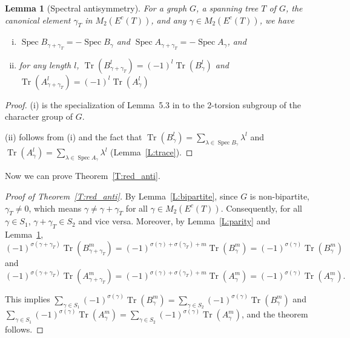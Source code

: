 \documentclass[11pt]{amsart}
\theoremstyle{plain}
\newtheorem{lemma}[theorem]{Lemma}
\theoremstyle{definition}
\DeclareMathOperator{\spec}{\operatorname{Spec}}
\DeclareMathOperator{\trace}{\operatorname{Tr}}
\numberwithin{equation}{section}
\begin{document}
\begin{lemma}[Spectral antisymmetry] \label{L:antisymmetry}
For a graph $G$, a spanning tree $T$ of $G$, the canonical element $\gamma_T$ in $M_2(E^c(T) )$, and any $\gamma\in M_2(E^c(T))$, we have 
\begin{enumerate}[(i)]
\item $\spec B_{\gamma+\gamma_T}=-\spec B_\gamma$ and $\spec A_{\gamma+\gamma_T} = -\spec A_\gamma$, and
\item for any length $l$, $\trace\left(B_{\gamma+\gamma_T}^l\right) = (-1)^l \trace\left(B_\gamma^l\right)$ and $\trace\left(A_{\gamma+\gamma_T}^l\right) = (-1)^l \trace\left(A_\gamma^l\right)$
\end{enumerate}
\end{lemma}


\begin{proof}
(i) is the specialization of Lemma~5.3 in \cite{LR2024spectral} to the 2-torsion subgroup of the character group of $G$.

(ii) follows from (i) and the fact that $\trace\left(B_\gamma^l\right)=\sum_{\lambda\in \spec B_\gamma}\lambda^l$ and $\trace\left(A_\gamma^l\right)=\sum_{\lambda\in \spec A_\gamma}\lambda^l$ (Lemma~\ref{L:trace}). 
\end{proof}

Now we can prove Theorem~\ref{T:red_anti}. 
\begin{proof}[Proof of Theorem~\ref{T:red_anti}]
By Lemma~\ref{L:bipartite}, since $G$ is non-bipartite, $\gamma_T\neq 0$, which means  $\gamma\neq \gamma+\gamma_T$ for all $\gamma\in M_2(E^c(T) )$. Consequently, for all $\gamma\in S_1$, $\gamma+\gamma_T\in S_2$ and vice versa. Moreover, by Lemma~\ref{L:parity} and Lemma~\ref{L:antisymmetry}, 
$$(-1)^{\sigma(\gamma+\gamma_T)}\trace\left(B_{\gamma+\gamma_T}^m\right)=(-1)^{\sigma(\gamma)+\sigma(\gamma_T)+m}\trace\left(B_\gamma^m\right) =(-1)^{\sigma(\gamma)}\trace\left(B_\gamma^m\right) $$
and 
$$(-1)^{\sigma(\gamma+\gamma_T)}\trace\left(A_{\gamma+\gamma_T}^m\right)=(-1)^{\sigma(\gamma)+\sigma(\gamma_T)+m}\trace\left(A_\gamma^m\right) =(-1)^{\sigma(\gamma)}\trace\left(A_\gamma^m\right).$$

This implies $\sum_{\gamma\in S_1}(-1)^{\sigma(\gamma)}\trace\left(B_\gamma^m\right) = \sum_{\gamma\in S_2}(-1)^{\sigma(\gamma)}\trace\left(B_\gamma^m\right)$
and $\sum_{\gamma\in S_1}(-1)^{\sigma(\gamma)}\trace\left(A_\gamma^m\right) = \sum_{\gamma\in S_2}(-1)^{\sigma(\gamma)}\trace\left(A_\gamma^m\right)$, and the theorem follows. 
\end{proof}
\end{document}
